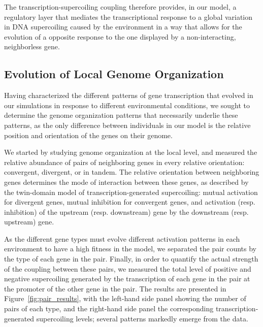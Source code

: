The transcription-supercoiling coupling therefore provides, in our model, a regulatory layer that mediates the transcriptional response to a global variation in DNA supercoiling caused by the environment in a way that allows for the evolution of a opposite response to the one displayed by a non-interacting, neighborless gene.


\subsection{Evolution of Local Genome Organization}

Having characterized the different patterns of gene transcription that evolved in our simulations in response to different environmental conditions, we sought to determine the genome organization patterns that necessarily underlie these patterns, as the only difference between individuals in our model is the relative position and orientation of the genes on their genome.

We started by studying genome organization at the local level, and measured the relative abundance of pairs of neighboring genes in every relative orientation: convergent, divergent, or in tandem.
The relative orientation between neighboring genes determines the mode of interaction between these genes, as described by the twin-domain model of transcription-generated supercoiling: mutual activation for divergent genes, mutual inhibition for convergent genes, and activation (resp. inhibition) of the upstream (resp. downstream) gene by the downstream (resp. upstream) gene.

As the different gene types must evolve different activation patterns in each environment to have a high fitness in the model, we separated the pair counts by the type of each gene in the pair.
Finally, in order to quantify the actual strength of the coupling between these pairs, we measured the total level of positive and negative supercoiling generated by the transcription of each gene in the pair at the promoter of the other gene in the pair.
The results are presented in Figure~\ref{fig:pair_results}, with the left-hand side panel showing the number of pairs of each type, and the right-hand side panel the corresponding transcription-generated supercoiling levels; several patterns markedly emerge from the data.


